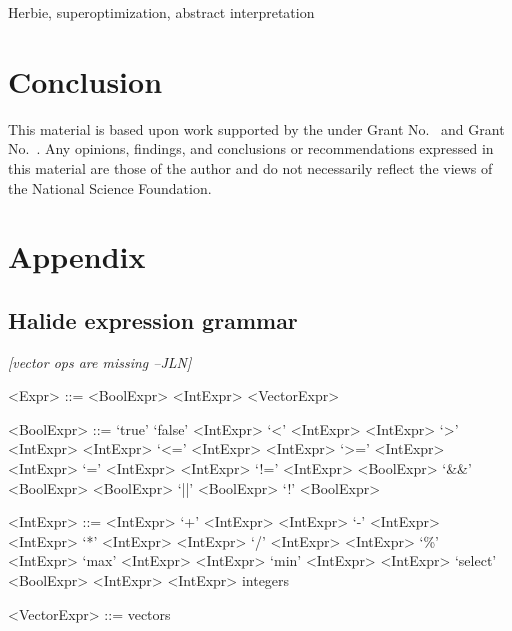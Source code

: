 \documentclass[sigplan,review,anonymous]{acmart}\settopmatter{printfolios=true,printccs=false,printacmref=false}
\newcommand{\jln}[1]{\textcolor{uwpurple}{\textit{[{#1} --JLN]}}}
\begin{document}
Herbie, superoptimization, abstract interpretation

\section{Conclusion}


\begin{acks}                            %
  This material is based upon work supported by the
   under Grant
  No.~ and Grant
  No.~.  Any opinions, findings, and
  conclusions or recommendations expressed in this material are those
  of the author and do not necessarily reflect the views of the
  National Science Foundation.
\end{acks}





\appendix
\section{Appendix}

\subsection{Halide expression grammar}
\label{ss:appendixA}

\jln{vector ops are missing}

\begin{grammar}
<Expr> ::= <BoolExpr> 
\alt <IntExpr> 
\alt <VectorExpr>

<BoolExpr> ::= `true'
\alt `false'
\alt <IntExpr> `<' <IntExpr>
\alt <IntExpr> `>' <IntExpr>
\alt <IntExpr> `<=' <IntExpr>
\alt <IntExpr> `>=' <IntExpr>
\alt <IntExpr> `=' <IntExpr>
\alt <IntExpr> `!=' <IntExpr>
\alt <BoolExpr> `&&' <BoolExpr>
\alt <BoolExpr> `||' <BoolExpr>
\alt `!' <BoolExpr>

<IntExpr> ::= <IntExpr> `+' <IntExpr>
\alt <IntExpr> `-' <IntExpr>
\alt <IntExpr> `*' <IntExpr>
\alt <IntExpr> `/' <IntExpr>
\alt <IntExpr> `\%' <IntExpr>
\alt `max' <IntExpr> <IntExpr>
\alt `min' <IntExpr> <IntExpr>
\alt `select' <BoolExpr> <IntExpr> <IntExpr>
\alt integers

<VectorExpr> ::= vectors
\end{grammar}
\end{document}
